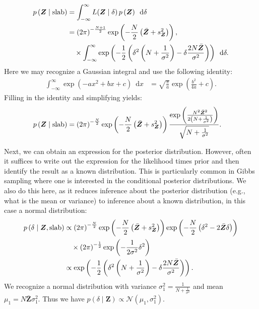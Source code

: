 \documentclass[a4paper]{article}
\newcommand{\shypo}[1]{%
	\ifnum#1>0%
		\mathrm{slab}
	\else%
		\mathrm{spike}
	\fi%
}
\newcommand{\dataZ}	{\bm{Z}}
\newcommand{\meanZ}	{\bar{\dataZ}}
\newcommand{\varZ}	{s_{\dataZ}^2}
\newcommand{\probp}[1]{p\left(#1\right)}
\newcommand{\lik}{L}
\newcommand{\dnorm}[2]{\mathcal{N}\left(#1, #2\right)}
\newcommand{\dx}[1]{\enspace\mathrm{d}{#1}}
\newenvironment{revision}{\color{black}}{\color{black}}
\begin{document}
\begin{revision}
\begin{align*}
	\probp{\dataZ\mid\shypo{1}} &=\int_{-\infty}^{\infty} \lik(\dataZ \mid \delta) \, \probp{\dataZ} 	\dx{\delta}\\
	&=\left(2\pi\right)^{-\frac{N+1}{2}}
	\exp\left(-\frac{N}{2}\left(\meanZ + \varZ\right)\right), \\
	&\quad\times\int_{-\infty}^{\infty}
	\exp\left(-\frac{1}{2}\left(\delta^2\left(N + \frac{1}{\sigma^2}\right) -\delta \frac{2N\meanZ}{\sigma^2}\right)\right)
	\dx{\delta}.
\end{align*}
Here we may recognize a Gaussian integral and use the following identity:
\begin{align*}
	\int_{-\infty}^{\infty}\exp\left(-ax^2+bx+c\right)\dx{x} &= \sqrt{\frac{\pi}{a}}\exp\left(\frac{b^2}{4a}+c\right).
\end{align*}
Filling in the identity and simplifying yields:
\begin{align*}
	\probp{\dataZ\mid\shypo{1}} &= 	
	\left(2\pi\right)^{-\frac{N}{2}}
	\exp\left(-\frac{N}{2}\left(\meanZ + \varZ\right)\right)
	\frac{
		\exp\left(\frac{N^2 \meanZ^2}{2\left(N+\frac{1}{\sigma^2}\right)}\right)
	}{
		\sqrt{N+\frac{1}{\sigma^2}}
	}.
\end{align*}

Next, we can obtain an expression for the posterior distribution. However, often it suffices to write out the expression for the likelihood times prior and then identify the result as a known distribution. This is particularly common in Gibbs sampling where one is interested in the conditional posterior distributions. We also do this here, as it reduces inference about the posterior distribution (e.g., what is the mean or variance) to inference about a known distribution, in this case a normal distribution:
\begin{align*}
	\probp{\delta \mid \dataZ, \shypo{1}} &\propto  
	\left(2\pi\right)^{-\frac{N}{2}}
	\exp\left(-\frac{N}{2}\left(\meanZ + \varZ\right)\right) 
	\exp\left(-\frac{N}{2}\left(\delta^2 -2\meanZ\delta\right)\right)\\
	&\quad\times \left(2\pi\right)^{-\frac{1}{2}} \exp\left(-\frac{1}{2\sigma^2}\delta^2\right)\\
	&\propto 
	\exp\left(-\frac{1}{2}\left(\delta^2\left(N + \frac{1}{\sigma^2}\right) -\delta \frac{2N\meanZ}{\sigma^2}\right)\right).
\end{align*}
We recognize a normal distribution with variance $\sigma_1^2 = \frac{1}{N + \frac{1}{\sigma^2}}$ and mean $\mu_1 = N\meanZ\sigma_1^2$. Thus we have $\probp{\delta \mid \dataZ} \propto \dnorm{\mu_1}{\sigma_1^2}$.


\end{revision}
\end{document}
